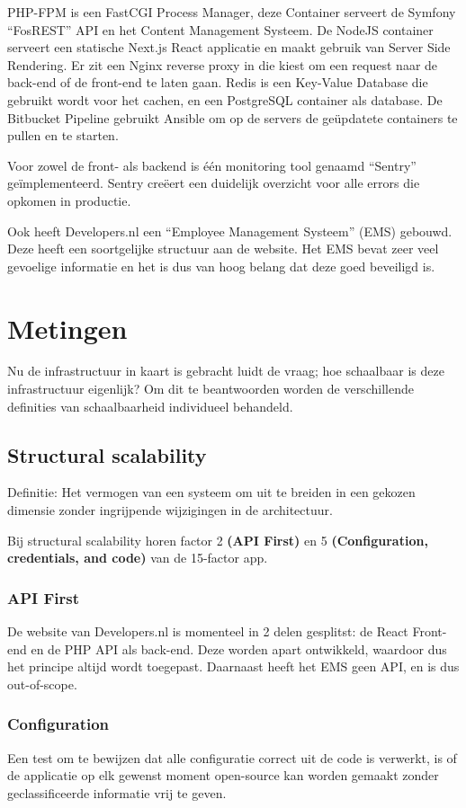 PHP-FPM is een FastCGI Process Manager, deze Container serveert de Symfony “FosREST” API en het Content Management Systeem. De NodeJS container serveert een statische Next.js React applicatie en maakt gebruik van Server Side Rendering. Er zit een Nginx reverse proxy in die kiest om een request naar de back-end of de front-end te laten gaan. Redis is een Key-Value Database die gebruikt wordt voor het cachen, en een PostgreSQL container als database. De Bitbucket Pipeline gebruikt Ansible om op de servers de geüpdatete containers te pullen en te starten.

Voor zowel de front- als backend is één monitoring tool genaamd \enquote{Sentry} geïmplementeerd. Sentry creëert een duidelijk overzicht voor alle errors die opkomen in productie.

Ook heeft Developers.nl een \enquote{Employee Management Systeem} (EMS) gebouwd. Deze heeft een soortgelijke structuur aan de website. Het EMS bevat zeer veel gevoelige informatie en het is dus van hoog belang dat deze goed beveiligd is.

\section{Metingen}

Nu de infrastructuur in kaart is gebracht luidt de vraag; hoe schaalbaar is deze infrastructuur eigenlijk? Om dit te beantwoorden worden de verschillende definities van schaalbaarheid individueel behandeld.

\subsection{Structural scalability}
Definitie: Het vermogen van een systeem om uit te breiden in een gekozen dimensie zonder ingrijpende wijzigingen in de architectuur.

Bij structural scalability horen factor 2 \textbf{(API First)} en 5 \textbf{(Configuration, credentials, and code)} van de 15-factor app. 

\subsubsection{API First}
De website van Developers.nl is momenteel in 2 delen gesplitst: de React Front-end en de PHP API als back-end. Deze worden apart ontwikkeld, waardoor dus het principe altijd wordt toegepast. Daarnaast heeft het EMS geen API, en is dus out-of-scope.

\subsubsection{Configuration}
Een test om te bewijzen dat alle configuratie correct uit de code is verwerkt, is of de applicatie op elk gewenst moment open-source kan worden gemaakt zonder geclassificeerde informatie vrij te geven.


